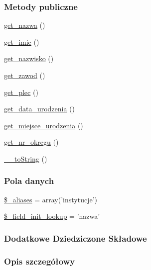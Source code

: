 \subsubsection*{Metody publiczne}
\begin{DoxyCompactItemize}
\item 
\hyperlink{classep___instytucja_ac0818f0049d7b84f08f77128f54cee36}{get\-\_\-nazwa} ()
\item 
\hyperlink{classep___instytucja_ac4b0c85dc2a130038f2d118dbd0c3d77}{get\-\_\-imie} ()
\item 
\hyperlink{classep___instytucja_abdd1d7ff92508da7f748ba1feec97af0}{get\-\_\-nazwisko} ()
\item 
\hyperlink{classep___instytucja_af80ca8310b60004454dd02a387deaa2c}{get\-\_\-zawod} ()
\item 
\hyperlink{classep___instytucja_ac7f9af5c3fa024e4c26a7b6bd4ce4bb4}{get\-\_\-plec} ()
\item 
\hyperlink{classep___instytucja_a880b240cd2d8c336fd1709bf0cb1ae2c}{get\-\_\-data\-\_\-urodzenia} ()
\item 
\hyperlink{classep___instytucja_ac57c08ec5e394a19c5bd9280c8376182}{get\-\_\-miejsce\-\_\-urodzenia} ()
\item 
\hyperlink{classep___instytucja_a2645a9f0aa5b0ccc482943348c033d0a}{get\-\_\-nr\-\_\-okregu} ()
\item 
\hyperlink{classep___instytucja_a7516ca30af0db3cdbf9a7739b48ce91d}{\-\_\-\-\_\-to\-String} ()
\end{DoxyCompactItemize}
\subsubsection*{Pola danych}
\begin{DoxyCompactItemize}
\item 
\hyperlink{classep___instytucja_ab4e31d75f0bc5d512456911e5d01366b}{\$\-\_\-aliases} = array('instytucje')
\item 
\hyperlink{classep___instytucja_a4a4d54ae35428077a7c61ec8a5139af3}{\$\-\_\-field\-\_\-init\-\_\-lookup} = 'nazwa'
\end{DoxyCompactItemize}
\subsubsection*{Dodatkowe Dziedziczone Składowe}


\subsubsection{Opis szczegółowy}


